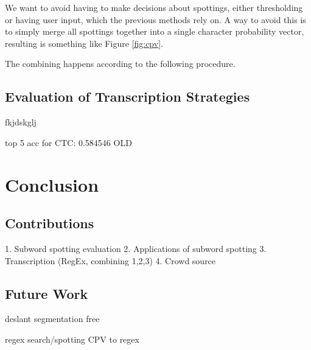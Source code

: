 \documentclass[ms,electronic,twosidetoc,letterpaper,chaptercenter,parttop,lol,lof,lot]{byumsphd}
\begin{document}
We want to avoid having to make decisions about spottings, either thresholding or having user input, which the previous methods rely on. A way to avoid this is to simply merge all spottings together into a single character probability vector, resulting is something like Figure \ref{fig:cpv}.

The combining happens according to the following procedure.


\section{Evaluation of Transcription Strategies}
fkjdskglj

top 5 acc for CTC: 0.584546 OLD






\chapter{Conclusion}

\section{Contributions}

1. Subword spotting evaluation
2. Applications of subword spotting
3. Transcription (RegEx, combining 1,2,3)
4. Crowd source

\section{Future Work}

deslant
segmentation free

regex search/spotting
CPV to regex




\end{document}
